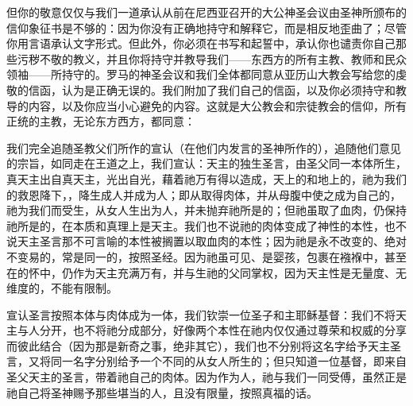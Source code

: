 但你的敬意仅仅与我们一道承认从前在尼西亚召开的大公神圣会议由圣神所颁布的信仰象征书是不够的：因为你没有正确地持守和解释它，而是相反地歪曲了；尽管你用言语承认文字形式。但此外，你必须在书写和起誓中，承认你也谴责你自己那些污秽不敬的教义，并且你将持守并教导我们——东西方的所有主教、教师和民众领袖——所持守的。罗马的神圣会议和我们全体都同意从亚历山大教会写给您的虔敬的信函，认为是正确无误的。我们附加了我们自己的信函，以及你必须持守和教导的内容，以及你应当小心避免的内容。这就是大公教会和宗徒教会的信仰，所有正统的主教，无论东方西方，都同意：\par

\par

我们完全追随圣教父们所作的宣认（在他们内发言的圣神所作的），追随他们意见的宗旨，如同走在王道之上，我们宣认：天主的独生圣言，由圣父同一本体所生，真天主出自真天主，光出自光，藉着祂万有得以造成，天上的和地上的，祂为我们的救恩降下，，降生成人并成为人；即从取得肉体，并从母腹中使之成为自己的，祂为我们而受生，从女人生出为人，并未抛弃祂所是的；但祂虽取了血肉，仍保持祂所是的，在本质和真理上是天主。我们也不说祂的肉体变成了神性的本性，也不说天主圣言那不可言喻的本性被搁置以取血肉的本性；因为祂是永不改变的、绝对不变易的，常是同一的，按照圣经。因为祂虽可见、是婴孩，包裹在襁褓中，甚至在的怀中，仍作为天主充满万有，并与生祂的父同掌权，因为天主性是无量度、无维度的，不能有限制。\par

宣认圣言按照本体与肉体成为一体，我们钦崇一位圣子和主耶稣基督：我们不将天主与人分开，也不将祂分成部分，好像两个本性在祂内仅仅通过尊荣和权威的分享而彼此结合（因为那是新奇之事，绝非其它），我们也不分别将这名字给予天主圣言，又将同一名字分别给予一个不同的从女人所生的；但只知道一位基督，即来自圣父天主的圣言，带着祂自己的肉体。因为作为人，祂与我们一同受傅，虽然正是祂自己将圣神赐予那些堪当的人，且没有限量，按照真福的话。\par

